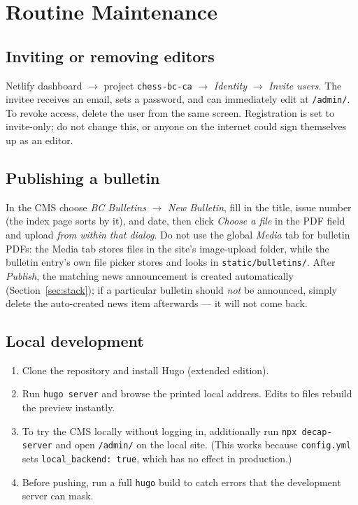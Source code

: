 \documentclass[12pt,letterpaper]{article}
\begin{document}
\section{Routine Maintenance}
\label{sec:ops}

\subsection{Inviting or removing editors}

Netlify dashboard $\rightarrow$ project \texttt{chess-bc-ca} $\rightarrow$
\emph{Identity} $\rightarrow$ \emph{Invite users}. The invitee receives an
email, sets a password, and can immediately edit at \texttt{/admin/}. To
revoke access, delete the user from the same screen. Registration is set to
invite-only; do not change this, or anyone on the internet could sign
themselves up as an editor.

\subsection{Publishing a bulletin}

In the CMS choose \emph{BC Bulletins} $\rightarrow$ \emph{New Bulletin},
fill in the title, issue number (the index page sorts by it), and date,
then click \emph{Choose a file} in the PDF field and upload \emph{from
within that dialog}. Do not use the global \emph{Media} tab for bulletin
PDFs: the Media tab stores files in the site's image-upload folder, while
the bulletin entry's own file picker stores and looks in
\texttt{static/bulletins/}. After \emph{Publish}, the matching news
announcement is created automatically (Section~\ref{sec:stack}); if a
particular bulletin should \emph{not} be announced, simply delete the
auto-created news item afterwards --- it will not come back.

\subsection{Local development}

\begin{enumerate}[nosep]
  \item Clone the repository and install Hugo (extended edition).
  \item Run \texttt{hugo server} and browse the printed local address.
        Edits to files rebuild the preview instantly.
  \item To try the CMS locally without logging in, additionally run
        \texttt{npx decap-server} and open \texttt{/admin/} on the local
        site. (This works because \texttt{config.yml} sets
        \texttt{local\_backend:\ true}, which has no effect in production.)
  \item Before pushing, run a full \texttt{hugo} build to catch errors that
        the development server can mask.
\end{enumerate}
\end{document}
